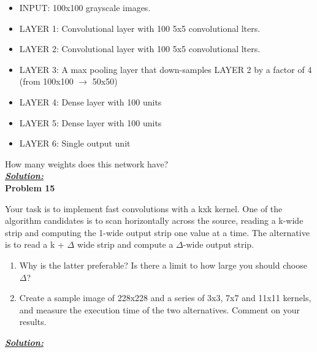 \documentclass{article}
\begin{document}
\begin{itemize}
    \item INPUT: 100x100 grayscale images.
    \item LAYER 1: Convolutional layer with 100 5x5 convolutional lters.
    \item LAYER 2: Convolutional layer with 100 5x5 convolutional lters.
    \item LAYER 3: A max pooling layer that down-samples LAYER 2 by a factor of 4 (from 100x100 $\rightarrow$ 50x50)
    \item LAYER 4: Dense layer with 100 units
    \item LAYER 5: Dense layer with 100 units
    \item LAYER 6: Single output unit
\end{itemize}

\noindent How many weights does this network have? \\

\noindent \underline{\textbf{\textit{Solution:}}} \\ 

\newpage
\noindent \textbf{Problem 15}

Your task is to implement fast convolutions with a kxk kernel. One of the algorithm
candidates is to scan horizontally across the source, reading a k-wide strip and computing
the 1-wide output strip one value at a time. The alternative is to read a k + $\Delta$ wide strip
and compute a $\Delta$-wide output strip.
\begin{enumerate} [label=\Alph*]
    \item Why is the latter preferable? Is there a limit to how large you should choose $\Delta$?
    \item Create a sample image of 228x228 and a series of 3x3, 7x7 and 11x11 kernels, and
measure the execution time of the two alternatives. Comment on your results.

\end{enumerate}

\noindent \underline{\textbf{\textit{Solution:}}} \\ 
\end{document}
